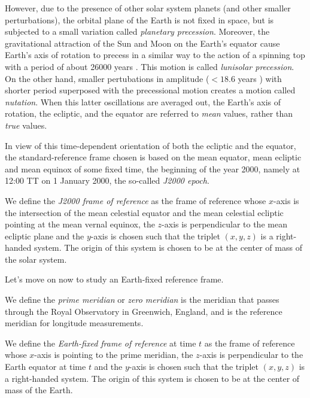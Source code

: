 \documentclass[../main.tex]{subfiles}
\begin{document}
However, due to the presence of other solar system planets (and other smaller perturbations), the orbital plane of the Earth is not fixed in space, but is subjected to a small variation called \emph{planetary precession}. Moreover, the gravitational attraction of the Sun and Moon on the Earth's equator cause Earth's axis of rotation to precess in a similar way to the action of a spinning top with a period of about 26000 years \cite{montenbruck}. This motion is called \emph{lunisolar precession}. On the other hand, smaller pertubations in amplitude ($<18.6$ years \cite{wiki:eci}) with shorter period superposed with the precessional motion creates a motion called \emph{nutation}. When this latter oscillations are averaged out, the Earth's axis of rotation, the ecliptic, and the equator are referred to \emph{mean} values, rather than \emph{true} values.

In view of this time-dependent orientation of both the ecliptic and the equator, the standard-reference frame chosen is based on the mean equator, mean ecliptic and mean equinox of some fixed time, the beginning of the year 2000, namely at 12:00 TT on 1 January 2000, the so-called \emph{J2000 epoch}.
\begin{definition}
  We define the \emph{J2000 frame of reference} as the frame of reference whose $x$-axis is the intersection of the mean celestial equator and the mean celestial ecliptic pointing at the mean vernal equinox, the $z$-axis is perpendicular to the mean ecliptic plane and the $y$-axis is chosen such that the triplet $(x,y,z)$ is a right-handed system. The origin of this system is chosen to be at the center of mass of the solar system.
\end{definition}

Let's move on now to study an Earth-fixed reference frame.
\begin{definition}
  We define the \emph{prime meridian} or \emph{zero meridian} is the meridian that passes through the Royal Observatory in Greenwich, England, and is the reference meridian for longitude measurements.
\end{definition}
\begin{definition}
  We define the \emph{Earth-fixed frame of reference} at time $t$ as the frame of reference whose $x$-axis is pointing to the prime meridian, the $z$-axis is perpendicular to the Earth equator at time $t$ and the $y$-axis is chosen such that the triplet $(x,y,z)$ is a right-handed system. The origin of this system is chosen to be at the center of mass of the Earth.
\end{definition}
\end{document}
